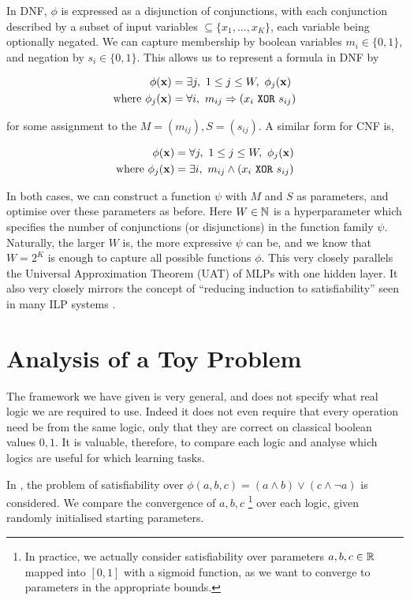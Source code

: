 In DNF, $\phi$ is expressed as a disjunction of conjunctions, with each conjunction described by a subset of input variables $\subseteq \{x_1,\dots,x_K\}$, each variable being optionally negated. We can capture membership by boolean variables $m_i \in \{0,1\}$, and negation by $s_i \in \{0,1\}$. This allows us to represent a formula in DNF by

$$
\begin{aligned}
\phi(\mathbf{x}) &= \exists j,\ 1 \leq j \leq W,\ \phi_j(\mathbf{x}) \\
\text{where } \phi_j(\mathbf{x}) &= \forall i,\ m_{ij} \Rightarrow (x_i \ \texttt{XOR}\  s_{ij})
\end{aligned}
$$

for some assignment to the $M = (m_{ij}), S = (s_{ij})$. A similar form for CNF is,

$$
\begin{aligned}
\phi(\mathbf{x}) &= \forall j,\ 1 \leq j \leq W,\ \phi_j(\mathbf{x}) \\
\text{where } \phi_j(\mathbf{x}) &= \exists i,\ m_{ij} \land (x_i \ \texttt{XOR}\  s_{ij})
\end{aligned}
$$

In both cases, we can construct a function $\psi$ with $M$ and $S$ as parameters, and optimise over these parameters as before. Here $W \in\mathbb{N}$ is a hyperparameter which specifies the number of conjunctions (or disjunctions) in the function family $\psi$. Naturally, the larger $W$ is, the more expressive $\psi$ can be, and we know that $W = 2^K$ is enough to capture all possible functions $\phi$. This very closely parallels the Universal Approximation Theorem (UAT) of MLPs with one hidden layer. It also very closely mirrors the concept of ``reducing induction to satisfiability'' seen in many ILP systems \cite{diffilp}.

\section{Analysis of a Toy Problem}

The framework we have given is very general, and does not specify what real logic we are required to use. Indeed it does not even require that every operation need be from the same logic, only that they are correct on classical boolean values $0,1$. It is valuable, therefore, to compare each logic and analyse which logics are useful for which learning tasks.

In \cite{analyzefuzzy}, the problem of satisfiability over $\phi(a,b,c) = (a \land b) \lor (c \land \lnot a)$ is considered. We compare the convergence of $a, b, c$ \footnote{In practice, we actually consider satisfiability over parameters $a, b, c \in \mathbb{R}$ mapped into $[0,1]$ with a sigmoid function, as we want to converge to parameters in the appropriate bounds.} over each logic, given randomly initialised starting parameters.

